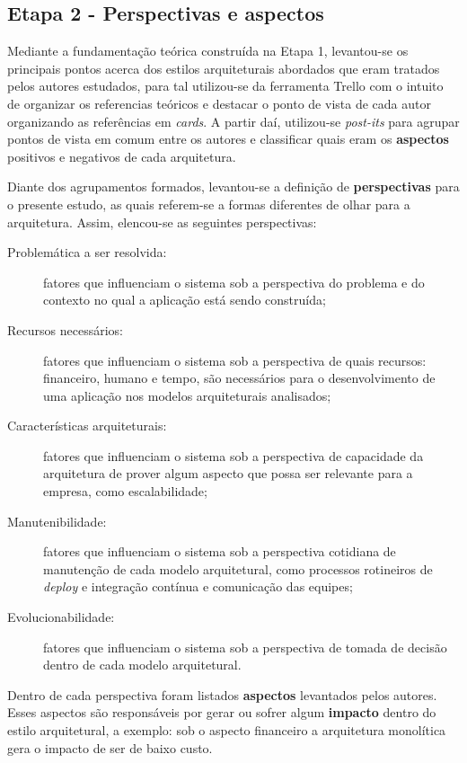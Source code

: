 \subsection{Etapa 2 - Perspectivas e aspectos}
\label{met:perspectivas}

Mediante a fundamentação teórica construída na Etapa 1, levantou-se os principais pontos acerca dos
estilos arquiteturais abordados que eram tratados pelos autores estudados, para tal utilizou-se da
ferramenta Trello com o intuito de organizar os referencias teóricos e destacar o ponto de vista de
cada autor organizando as referências em \textit{cards}. A partir daí, utilizou-se \textit{post-its}
para agrupar pontos de vista em comum entre os autores e classificar quais eram os \textbf{aspectos}
positivos e negativos de cada arquitetura.

Diante dos agrupamentos formados, levantou-se a definição de \textbf{perspectivas} para o presente
estudo, as quais referem-se a formas diferentes de olhar para a arquitetura. Assim, elencou-se as
seguintes perspectivas:

\begin{description}
    \item[Problemática a ser resolvida:] fatores que influenciam o sistema sob a perspectiva do
        problema e do contexto no qual a aplicação está sendo construída;
    \item[Recursos necessários:] fatores que influenciam o sistema sob a perspectiva de quais
        recursos: financeiro, humano e tempo, são necessários para o desenvolvimento de uma
        aplicação nos modelos arquiteturais analisados;
    \item[Características arquiteturais:] fatores que influenciam o sistema sob a perspectiva de
        capacidade da arquitetura de prover algum aspecto que possa ser relevante para a empresa,
        como escalabilidade;
    \item[Manutenibilidade:] fatores que influenciam o sistema sob a perspectiva cotidiana de
        manutenção de cada modelo arquitetural, como processos rotineiros de \textit{deploy} e
        integração contínua e comunicação das equipes;
    \item[Evolucionabilidade:] fatores que influenciam o sistema sob a perspectiva de tomada de
        decisão dentro de cada modelo arquitetural.
\end{description}

Dentro de cada perspectiva foram listados \textbf{aspectos} levantados pelos autores. Esses aspectos
são responsáveis por gerar ou sofrer algum \textbf{impacto} dentro do estilo arquitetural, a exemplo:
sob o aspecto financeiro a arquitetura monolítica gera o impacto de ser de baixo custo.


